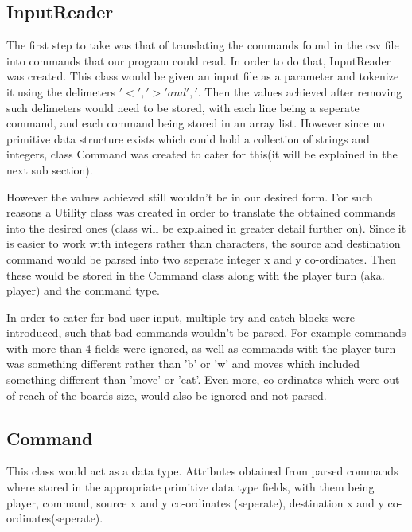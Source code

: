 \documentclass[12pt, A4]{report}
\begin{document}
		\subsection*{InputReader}
		\par
		The first step to take was that of translating the commands found in the csv file into commands that our program could read. In order to do that, InputReader was created. This class would be given an input file as a parameter and tokenize it using the delimeters $'<', '>' and ','$. Then the values achieved after removing such delimeters would need to be stored, with each line being a seperate command, and each command being stored in an array list. However since no primitive data structure exists which could hold a collection of strings and integers, class Command was created to cater for this(it will be explained in the next sub section).\\

		\par
		However the values achieved still wouldn't be in our desired form. For such reasons a Utility class was created in order to translate the obtained commands into the desired ones (class will be explained in greater detail further on). Since it is easier to work with integers rather than characters, the source and destination command would be parsed into two seperate integer x and y co-ordinates. Then these would be stored in the Command class along with the player turn (aka. player) and the command type.\\

		\par
		In order to cater for bad user input, multiple try and catch blocks were introduced, such that bad commands wouldn't be parsed. For example commands with more than 4 fields were ignored, as well as commands with the player turn was something different rather than 'b' or 'w' and moves which included something different than 'move' or 'eat'. Even more, co-ordinates which were out of reach of the boards size, would also be ignored and not parsed.

		\subsection*{Command}
		This class would act as a data type. Attributes obtained from parsed commands where stored in the appropriate primitive data type fields, with them being player, command, source x and y co-ordinates (seperate), destination x and y co-ordinates(seperate).
\end{document}
